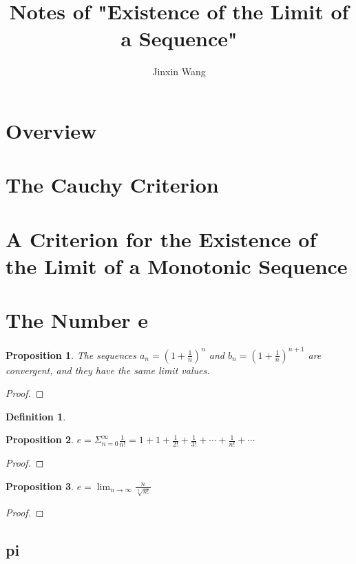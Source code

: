 \documentclass[onecolumn]{ctexart}
\title{Notes of "Existence of the Limit of a Sequence"}
\author{Jinxin Wang}
\date{}
\newtheorem{definition}{Definition}
\newtheorem{proposition}{Proposition}
\begin{document}
\maketitle

\section{Overview}

\section{The Cauchy Criterion}

\section{A Criterion for the Existence of the Limit of a Monotonic Sequence}

\section{The Number e}

\begin{proposition}
  The sequences $a_n = (1 + \frac{1}{n})^n$ and $b_n = (1 + \frac{1}{n})^{n+1}$ 
  are convergent, and they have the same limit values.
\end{proposition}
\begin{proof}
  
\end{proof}

\begin{definition}
  
\end{definition}

\begin{proposition}
  $e = \Sigma_{n=0}^{\infty} \frac{1}{n!} = 1 + 1 + \frac{1}{2!} + \frac{1}{3!} + \cdots + \frac{1}{n!} + \cdots$
\end{proposition}
\begin{proof}
  
\end{proof}

\begin{proposition}
  $e = \lim_{n \to \infty} \frac{n}{\sqrt[n]{n!}}$
\end{proposition}
\begin{proof}
  
\end{proof}

\subsection{pi}
\end{document}
